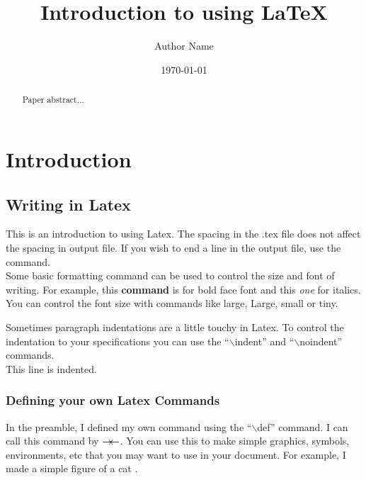 \documentclass[11pt]{article}
\author{Author Name}
\title{\mbox{\hspace{1cm}}\\\vspace{3cm}
Introduction to using \LaTeX}
\date{\today}
\def\contradiction{\rightarrow\hspace{-.1cm}\leftarrow}%
\def\kcall{\stackrel{\hat\cdot\;\;\;\hat\cdot}{\stackrel{-\hspace{-.15cm}{>}\;\;\nabla\;\;<\hspace{-.15cm}{-}}{\begin{sideways}$\succ$\end{sideways}}}}
\def\kitty{{\resizebox{1.1cm}{.6cm}{$\kcall$}}}
\begin{document}
\maketitle%


\begin{abstract}
Paper abstract...
\end{abstract}

\pagebreak


\section{Introduction} %

\subsection{Writing in Latex} %

This is an introduction to using Latex.  The spacing in the .tex file does     not          affect                  the            spacing                                          in         output               file.  If you wish to end a line in the output file, use the command.\\

Some basic formatting command can be used to control the size and font of writing.  For example, this {\bf command} is for bold face font and this {\it one} for italics.  You can control the font size with commands like {\large large}, {\Large Large}, {\small small} or {\tiny tiny}.

\noindent Sometimes paragraph indentations are a little touchy in Latex.  To control the indentation to your specifications you can use the ``$\backslash$indent'' and ``$\backslash$noindent'' commands.\\
\indent This line is indented.

\subsubsection{Defining your own Latex Commands} %
In the preamble, I defined my own command using the ``$\backslash$def'' command.  I can call this command by $\contradiction$.  You can use this to make simple graphics, symbols, environments, etc that you may want to use in your document.  For example, I made a simple figure of a cat \kitty.
\end{document}
